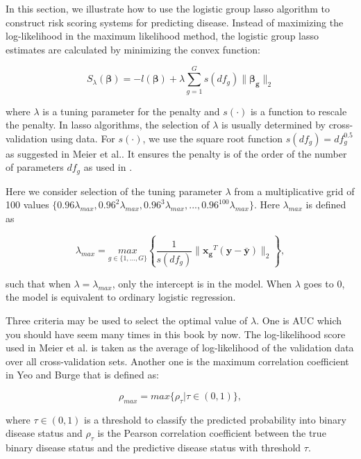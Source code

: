 \documentclass[
  12pt,
]{krantz}
\begin{document}
In this section, we illustrate how to use the logistic group lasso algorithm to construct risk scoring systems for predicting disease. Instead of maximizing the log-likelihood in the maximum likelihood method, the logistic group lasso estimates are calculated by minimizing the convex function:

\[
S_{\lambda}(\mathbf{\beta})=-l(\mathbf{\beta})+\lambda\sum_{g=1}^{G}s(df_{g})\parallel\mathbf{\beta_{g}}\parallel_{2}
\]

where \(\lambda\) is a tuning parameter for the penalty and \(s(\cdot)\) is a function to rescale the penalty. In lasso algorithms, the selection of \(\lambda\) is usually determined by cross-validation using data. For \(s(\cdot)\), we use the square root function \(s(df_g)=df_g^{0.5}\) as suggested in Meier et al.\citep{Meier2008}. It ensures the penalty is of the order of the number of parameters \(df_g\) as used in \citep{Yuan2007}.

Here we consider selection of the tuning parameter \(\lambda\) from a multiplicative grid of 100 values \(\{0.96\lambda_{max},0.96^{2}\lambda_{max},0.96^{3}\lambda_{max},...,0.96^{100}\lambda_{max}\}\). Here \(\lambda_{max}\) is defined as

\begin{equation}
\lambda_{max}=\underset{g\in\{1,...,G\}}{max}\left\{\frac{1}{s(df_{g})}\parallel \mathbf{x_{g}}^{T}(\mathbf{y}-\bar{\mathbf{y}} )\parallel_{2}\right\},
\end{equation}

such that when \(\lambda=\lambda_{max}\), only the intercept is
in the model. When \(\lambda\) goes to \(0\), the model is equivalent to ordinary
logistic regression.

Three criteria may be used to select the optimal value of \(\lambda\). One is AUC which you should have seem many times in this book by now. The log-likelihood score used in Meier et al. \citep{Meier2008} is taken as the average of log-likelihood of the validation data over all cross-validation sets. Another one is the maximum correlation coefficient in Yeo and Burge \citep{Yeo2004} that is defined as:

\[
\rho_{max}=max\{\rho_{\tau}|\tau\in(0,1)\},
\]

where \(\tau\in(0,1)\) is a threshold to classify the predicted probability into binary disease status and \(\rho_\tau\) is the Pearson correlation coefficient between the true binary disease status and the predictive disease status with threshold \(\tau\).
\end{document}

